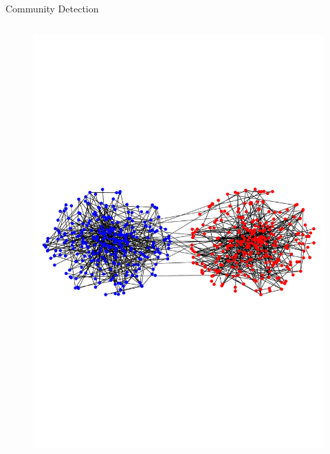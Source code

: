 \documentclass[notheorems]{beamer}
\begin{document}
\begin{frame}{Community Detection}
\begin{columns}
\begin{figure}
		\includegraphics[width=\textwidth]{bennot.pdf}
		\end{figure}
	\end{columns}
\end{frame}
\end{document}
